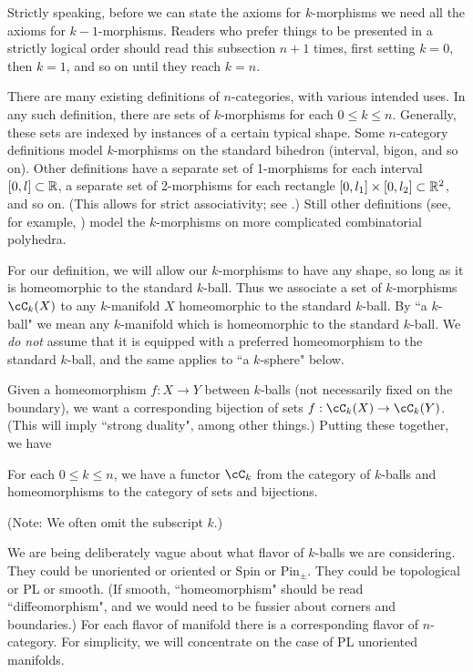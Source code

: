 Strictly speaking, before we can state the axioms for $k$-morphisms we need all the axioms 
for $k{-}1$-morphisms.
Readers who prefer things to be presented in a strictly logical order should read this 
subsection $n+1$ times, first setting $k=0$, then $k=1$, and so on until they reach $k=n$.

\medskip

There are many existing definitions of $n$-categories, with various intended uses.
In any such definition, there are sets of $k$-morphisms for each $0 \leq k \leq n$.
Generally, these sets are indexed by instances of a certain typical shape. 
Some $n$-category definitions model $k$-morphisms on the standard bihedron (interval, bigon, and so on).
Other definitions have a separate set of 1-morphisms for each interval $[0,l] \subset \mathbb{R}$, 
a separate set of 2-morphisms for each rectangle $[0,l_1]\times [0,l_2] \subset \mathbb{R}^2$,
and so on.
(This allows for strict associativity; see \cite{ulrike-tillmann-2008,0909.2212}.)
Still other definitions (see, for example, \cite{MR2094071})
model the $k$-morphisms on more complicated combinatorial polyhedra.

For our definition, we will allow our $k$-morphisms to have any shape, so long as it is 
homeomorphic to the standard $k$-ball.
Thus we associate a set of $k$-morphisms $\cC_k(X)$ to any $k$-manifold $X$ homeomorphic 
to the standard $k$-ball.
By ``a $k$-ball" we mean any $k$-manifold which is homeomorphic to the 
standard $k$-ball.
We {\it do not} assume that it is equipped with a 
preferred homeomorphism to the standard $k$-ball, and the same applies to ``a $k$-sphere" below.

Given a homeomorphism $f:X\to Y$ between $k$-balls (not necessarily fixed on 
the boundary), we want a corresponding
bijection of sets $f:\cC_k(X)\to \cC_k(Y)$.
(This will imply ``strong duality", among other things.) Putting these together, we have

\begin{axiom}[Morphisms]
\label{axiom:morphisms}
For each $0 \le k \le n$, we have a functor $\cC_k$ from 
the category of $k$-balls and 
homeomorphisms to the category of sets and bijections.
\end{axiom}


(Note: We often omit the subscript $k$.)

We are being deliberately vague about what flavor of $k$-balls
we are considering.
They could be unoriented or oriented or Spin or $\mbox{Pin}_\pm$.
They could be topological or PL or smooth.
(If smooth, ``homeomorphism" should be read ``diffeomorphism", and we would need
to be fussier about corners and boundaries.)
For each flavor of manifold there is a corresponding flavor of $n$-category.
For simplicity, we will concentrate on the case of PL unoriented manifolds.

